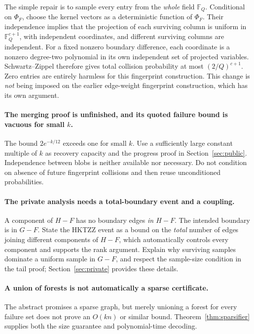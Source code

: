 \documentclass[11pt]{article}
\theoremstyle{remark}\newtheorem{remark}[theorem]{Remark}
\newcommand{\F}{\mathbb F}
\begin{document}
The simple repair is to sample every entry from the \emph{whole} field $\F_Q$. Conditional on $\Phi_F$, choose the kernel vectors as a deterministic function of $\Phi_F$. Their independence implies that the projection of each surviving column is uniform in $\F_Q^{c+1}$, with independent coordinates, and different surviving columns are independent. For a fixed nonzero boundary difference, each coordinate is a nonzero degree-two polynomial in its own independent set of projected variables. Schwartz--Zippel therefore gives total collision probability at most $(2/Q)^{c+1}$. Zero entries are entirely harmless for this fingerprint construction. This change is \emph{not} being imposed on the earlier edge-weight fingerprint construction, which has its own argument.

\paragraph{The merging proof is unfinished, and its quoted failure bound is vacuous for small $k$.}
The bound $2e^{-k/12}$ exceeds one for small $k$. Use a sufficiently large constant multiple of $k$ as recovery capacity and the progress proof in Section~\ref{sec:public}. Independence between blobs is neither available nor necessary. Do not condition on absence of future fingerprint collisions and then reuse unconditioned probabilities.

\paragraph{The private analysis needs a total-boundary event and a coupling.}
A component of $H-F$ has no boundary edges \emph{in $H-F$}. The intended boundary is in $G-F$. State the HKTZZ event as a bound on the \emph{total} number of edges joining different components of $H-F$, which automatically controls every component and supports the rank argument. Explain why surviving samples dominate a uniform sample in $G-F$, and respect the sample-size condition in the tail proof; Section~\ref{sec:private} provides these details.

\paragraph{A union of forests is not automatically a sparse certificate.}
The abstract promises a sparse graph, but merely unioning a forest for every failure set does not prove an $O(kn)$ or similar bound. Theorem~\ref{thm:sparsifier} supplies both the size guarantee and polynomial-time decoding.
\end{document}
